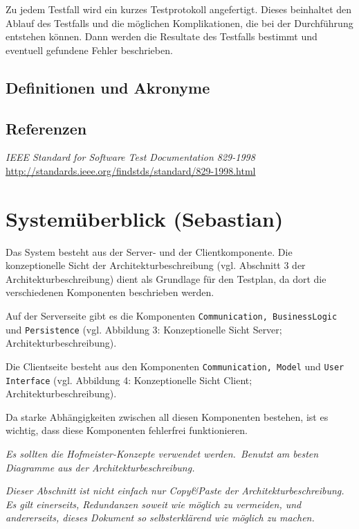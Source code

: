 \documentclass[fontsize=12pt,paper=a4,twoside]{scrartcl}
\begin{document}
Zu jedem Testfall wird ein kurzes Testprotokoll angefertigt. Dieses beinhaltet den Ablauf des Testfalls und die möglichen Komplikationen, die bei der Durchführung entstehen können. Dann werden die Resultate des Testfalls bestimmt und eventuell gefundene Fehler beschrieben.

\subsection{Definitionen und Akronyme}
\label{c00b}


\subsection{Referenzen}
\emph{IEEE Standard for Software Test Documentation 829-1998}\\
\url{http://standards.ieee.org/findstds/standard/829-1998.html}





\section{Systemüberblick (Sebastian)}\label{c02}
Das System besteht aus der Server- und der Clientkomponente. Die konzeptionelle Sicht der Architekturbeschreibung (vgl. Abschnitt 3 der Architekturbeschreibung) dient als Grundlage für den Testplan, da dort die verschiedenen Komponenten  beschrieben werden.

Auf der Serverseite gibt es die Komponenten \texttt{Communication, BusinessLogic} und \texttt{Persistence} (vgl. Abbildung 3: Konzeptionelle Sicht Server; Architekturbeschreibung).

Die Clientseite besteht aus den Komponenten \texttt{Communication, Model} und \texttt{User Interface} (vgl. Abbildung 4: Konzeptionelle Sicht Client; Architekturbeschreibung).

Da starke Abhängigkeiten zwischen all diesen Komponenten bestehen, ist es wichtig, dass diese Komponenten fehlerfrei funktionieren. 


{\em Es sollten die Hofmeister-Konzepte verwendet
  werden.\ Benutzt am besten Diagramme aus der Architekturbeschreibung.}

\emph{Dieser Abschnitt ist nicht einfach nur Copy\&Paste der
  Architekturbeschreibung. Es gilt einerseits, Redundanzen soweit wie
  möglich zu vermeiden, und andererseits, dieses Dokument so
  selbsterklärend wie möglich zu machen.}
\end{document}
